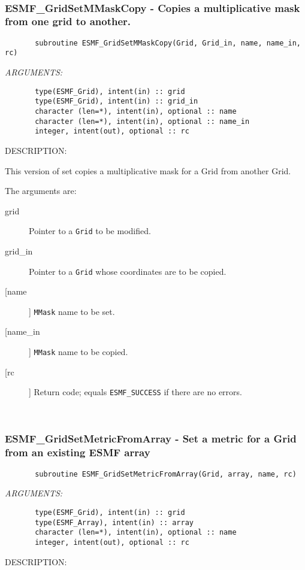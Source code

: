 \mbox{}\hrulefill\ 
 
\subsubsection{ESMF\_GridSetMMaskCopy - Copies a multiplicative mask from one grid to another.}


 
\begin{verbatim}       subroutine ESMF_GridSetMMaskCopy(Grid, Grid_in, name, name_in, rc)\end{verbatim}{\em ARGUMENTS:}
\begin{verbatim}       type(ESMF_Grid), intent(in) :: grid
       type(ESMF_Grid), intent(in) :: grid_in
       character (len=*), intent(in), optional :: name
       character (len=*), intent(in), optional :: name_in
       integer, intent(out), optional :: rc\end{verbatim}
{\sf DESCRIPTION:\\ }


       This version of set copies a multiplicative mask for a Grid from another
       Grid.
  
       The arguments are:
       \begin{description}
       \item[grid]
            Pointer to a {\tt Grid} to be modified.
       \item[grid\_in]
            Pointer to a {\tt Grid} whose coordinates are to be copied.
       \item [[name]]
             {\tt MMask} name to be set.
       \item [[name\_in]]
             {\tt MMask} name to be copied.
       \item[[rc]]
            Return code; equals {\tt ESMF\_SUCCESS} if there are no errors.
       \end{description}
   
 
\mbox{}\hrulefill\ 
 
\subsubsection{ESMF\_GridSetMetricFromArray - Set a metric for a Grid from an existing ESMF array}


 
\begin{verbatim}       subroutine ESMF_GridSetMetricFromArray(Grid, array, name, rc)\end{verbatim}{\em ARGUMENTS:}
\begin{verbatim}       type(ESMF_Grid), intent(in) :: grid
       type(ESMF_Array), intent(in) :: array
       character (len=*), intent(in), optional :: name
       integer, intent(out), optional :: rc\end{verbatim}
{\sf DESCRIPTION:\\ }


